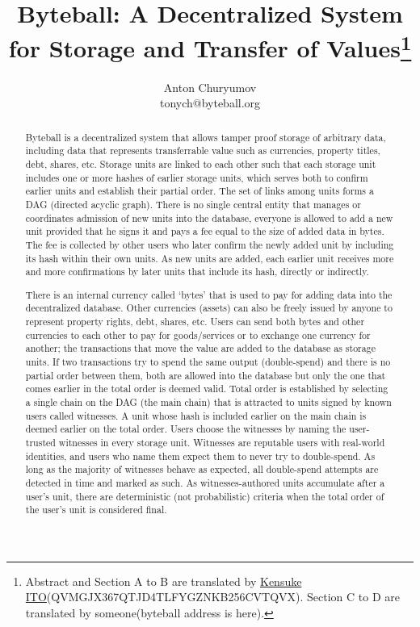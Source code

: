 \documentclass[a4paper, dvipdfmx]{jsarticle}
\title{Byteball: A Decentralized System for Storage and Transfer of Values\thanks{Abstract and Section A to B are translated by \href{http://knskito.com/}{Kensuke ITO}(QVMGJX367QTJD4TLFYGZNKB256CVTQVX). Section C to D are translated by someone(byteball address is here).}}
\author{Anton Churyumov\\tonych@byteball.org}
\date{}
\begin{document}
\maketitle

\begin{abstract}
Byteball is a decentralized system that allows tamper proof storage of arbitrary data, including data that represents transferrable value such as currencies, property titles, debt, shares, etc. Storage units are linked to each other such that each storage unit includes one or more hashes of earlier storage units, which serves both to confirm earlier units and establish their partial order. The set of links among units forms a DAG (directed acyclic graph). There is no single central entity that manages or coordinates admission of new units into the database, everyone is allowed to add a new unit provided that he signs it and pays a fee equal to the size of added data in bytes. The fee is collected by other users who later confirm the newly added unit by including its hash within their own units. As new units are added, each earlier unit receives more and more confirmations by later units that include its hash, directly or indirectly.

There is an internal currency called ‘bytes’ that is used to pay for adding data into the decentralized database. Other currencies (assets) can also be freely issued by anyone to represent property rights, debt, shares, etc. Users can send both bytes and other currencies to each other to pay for goods/services or to exchange one currency for another; the transactions that move the value are added to the database as storage units. If two transactions try to spend the same output (double-spend) and there is no partial order between them, both are allowed into the database but only the one that comes earlier in the total order is deemed valid. Total order is established by selecting a single chain on the DAG (the main chain) that is attracted to units signed by known users called witnesses. A unit whose hash is included earlier on the main chain is deemed earlier on the total order. Users choose the witnesses by naming the user-trusted witnesses in every storage unit. Witnesses are reputable users with real-world identities, and users who name them expect them to never try to double-spend. As long as the majority of witnesses behave as expected, all double-spend attempts are detected in time and marked as such. As witnesses-authored units accumulate after a user’s unit, there are deterministic (not probabilistic) criteria when the total order of the user’s unit is considered final.


\end{abstract}
\end{document}
